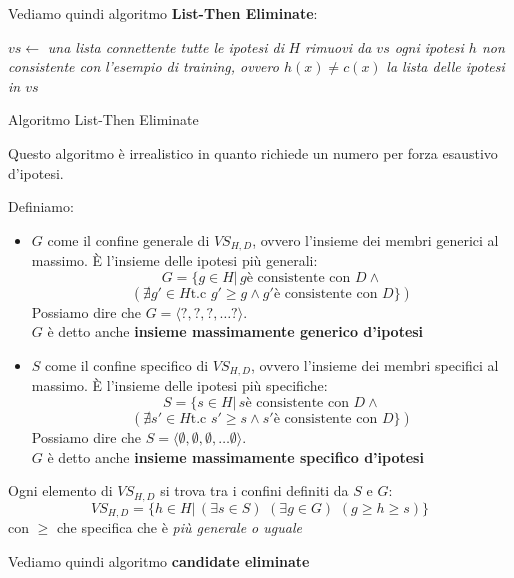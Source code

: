Vediamo quindi algoritmo \textbf{List-Then Eliminate}:
\begin{algorithm}[H]
  \begin{algorithmic}
    \State $vs \gets$ \textit{una lista connettente tutte le ipotesi di } $H$
    \State \textit{rimuovi da $vs$ ogni ipotesi $h$ non consistente con}
    \State \textit{l'esempio di training, ovvero $h(x)\neq c(x)$}
    \EndFor
    \Return \textit{la lista delle ipotesi in $vs$}
    \EndFunction
  \end{algorithmic}
  \caption{Algoritmo List-Then Eliminate}
\end{algorithm}
Questo algoritmo è irrealistico in quanto richiede un numero per forza esaustivo
d'ipotesi.
\begin{definizione}
  Definiamo:
  \begin{itemize}
    \item $G$ come il confine generale di $VS_{H, D}$, ovvero l'insieme dei
    membri generici al massimo. È l'insieme delle ipotesi più generali:
    \[G=\{g\in H|\, g\mbox{è consistente con }D \land\]
    \[ (\nexists g'\in H \mbox{t.c } g'\geq g \land g'\mbox{è consistente con
      }D\})\]
    Possiamo dire che $G=\langle ?,?,?,\ldots ?\rangle$.\\
    $G$ è detto anche \textbf{insieme massimamente generico d'ipotesi}
    \item $S$ come il confine specifico di $VS_{H, D}$, ovvero l'insieme dei
    membri specifici al massimo. È l'insieme delle ipotesi più specifiche:
     \[S=\{s\in H|\, s\mbox{è consistente con }D \land\]
    \[ (\nexists s'\in H \mbox{t.c } s'\geq s \land s'\mbox{è consistente con
      }D\})\]
    Possiamo dire che $S=\langle \emptyset,\emptyset,\emptyset,\ldots \emptyset
    \rangle$.\\
        $G$ è detto anche \textbf{insieme massimamente specifico d'ipotesi}

      \end{itemize}
    \end{definizione}
    \begin{definizione}
      Ogni elemento di $VS_{H, D}$ si trova tra i confini definiti da $S$ e $G$:
      \[VS_{H, D}=\{h\in H|\,(\exists s\in S)\,\,(\exists g\in G)\,\,(g\geq h\geq
        s)\}\]
      con $\geq$ che specifica che è \textit{più generale o uguale}
    \end{definizione}
    Vediamo quindi algoritmo \textbf{candidate eliminate}
